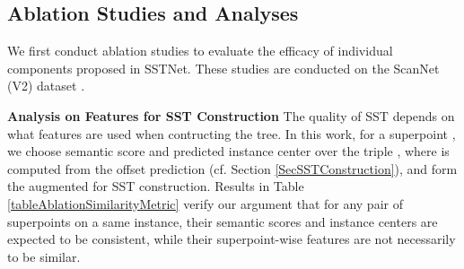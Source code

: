 \documentclass[10pt,twocolumn,letterpaper]{article}
\begin{document}
\subsection{Ablation Studies and Analyses}
\label{subsecAblationStudies}
We first conduct ablation studies to evaluate the efficacy of individual components proposed in SSTNet. These studies are conducted on the ScanNet (V2) dataset \cite{dai2017scannet}.

\noindent\textbf{Analysis on Features for SST Construction} The quality of SST depends on what features are used when contructing the tree. In this work, for a superpoint , we choose semantic score  and predicted instance center  over the triple , where  is computed from the offset prediction  (cf. Section \ref{SecSSTConstruction}), and form the augmented  for SST construction. Results in Table \ref{tableAblationSimilarityMetric} verify our argument that for any pair of superpoints on a same instance, their semantic scores and instance centers are expected to be consistent, while their superpoint-wise features are not necessarily to be similar.


\begin{table}[!htb]
    \centering
    \caption{Analysis on the features used for SST construction. Experiments are conducted on the validation set of ScanNet (V2) \cite{dai2017scannet}. Refer to Section \ref{SecSSTConstruction} for how the three types of features are computed. \label{tableAblationSimilarityMetric}}
\end{table}
\end{document}
